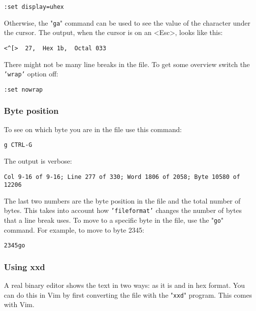\begin{Verbatim}[samepage=true]
 :set display=uhex
\end{Verbatim}

Otherwise, the "\texttt{ga}" command can be used to see the value of the character under the cursor.
The output, when the cursor is on an <Esc>, looks like this:

\begin{Verbatim}[samepage=true]
    <^[>  27,  Hex 1b,  Octal 033 
\end{Verbatim}

There might not be many line breaks in the file.
To get some overview switch the \texttt{'wrap'} option off:

\begin{Verbatim}[samepage=true]
 :set nowrap
\end{Verbatim}

\subsubsection{Byte position}
To see on which byte you are in the file use this command:

\begin{Verbatim}[samepage=true]
 g CTRL-G
\end{Verbatim}

The output is verbose:

\begin{Verbatim}[samepage=true]
    Col 9-16 of 9-16; Line 277 of 330; Word 1806 of 2058; Byte 10580 of 12206 
\end{Verbatim}

The last two numbers are the byte position in the file and the total number of bytes.
This takes into account how \texttt{'fileformat'} changes the number of bytes that a line break uses.
To move to a specific byte in the file, use the "\texttt{go}" command.
For example, to move to byte 2345:

\begin{Verbatim}[samepage=true]
 2345go
\end{Verbatim}

\subsubsection{Using xxd}
A real binary editor shows the text in two ways: as it is and in hex format.
You can do this in Vim by first converting the file with the "\texttt{xxd}" program.
This comes with Vim.

